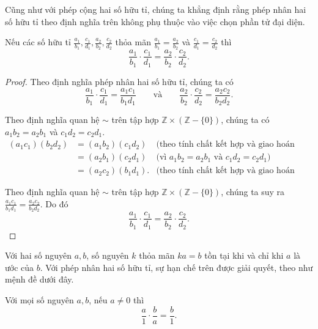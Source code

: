 Cũng như với phép cộng hai số hữu tỉ, chúng ta khẳng định rằng phép nhân hai số hữu tỉ theo định nghĩa trên không phụ thuộc vào việc chọn phần tử đại diện.
\begin{proposition}
    Nếu các số hữu tỉ $\frac{a_{1}}{b_{1}}, \frac{c_{1}}{d_{1}}, \frac{a_{2}}{b_{2}}, \frac{c_{2}}{d_{2}}$ thỏa mãn $\frac{a_{1}}{b_{1}} = \frac{a_{2}}{b_{2}}$ và $\frac{c_{1}}{d_{1}} = \frac{c_{2}}{d_{2}}$ thì
    \[
        \frac{a_{1}}{b_{1}}\cdot\frac{c_{1}}{d_{1}} = \frac{a_{2}}{b_{2}}\cdot\frac{c_{2}}{d_{2}}.
    \]
\end{proposition}

\begin{proof}
    Theo định nghĩa phép nhân hai số hữu tỉ, chúng ta có
    \[
        \frac{a_{1}}{b_{1}}\cdot\frac{c_{1}}{d_{1}} = \frac{a_{1}c_{1}}{b_{1}d_{1}}\qquad\text{và}\qquad\frac{a_{2}}{b_{2}}\cdot\frac{c_{2}}{d_{2}} = \frac{a_{2}c_{2}}{b_{2}d_{2}}.
    \]

    Theo định nghĩa quan hệ $\sim$ trên tập hợp $\mathbb{Z}\times(\mathbb{Z} - \{0\})$, chúng ta có $a_{1}b_{2} = a_{2}b_{1}$ và $c_{1}d_{2} = c_{2}d_{1}$.
    \begin{align*}
        (a_{1}c_{1})(b_{2}d_{2}) & = (a_{1}b_{2})(c_{1}d_{2})  & \text{(theo tính chất kết hợp và giao hoán của phép nhân số nguyên)} \\
                                 & = (a_{2}b_{1})(c_{2}d_{1})  & \text{(vì $a_{1}b_{2} = a_{2}b_{1}$ và $c_{1}d_{2} = c_{2}d_{1}$)}   \\
                                 & = (a_{2}c_{2})(b_{1}d_{1}). & \text{(theo tính chất kết hợp và giao hoán của phép nhân số nguyên)}
    \end{align*}

    Theo định nghĩa quan hệ $\sim$ trên tập hợp $\mathbb{Z}\times(\mathbb{Z} - \{0\})$, chúng ta suy ra $\frac{a_{1}c_{1}}{b_{1}d_{1}} = \frac{a_{2}c_{2}}{b_{2}d_{2}}$. Do đó
    \[
        \frac{a_{1}}{b_{1}}\cdot\frac{c_{1}}{d_{1}} = \frac{a_{2}}{b_{2}}\cdot\frac{c_{2}}{d_{2}}.
    \]
\end{proof}

Với hai số nguyên $a, b$, số nguyên $k$ thỏa mãn $ka = b$ tồn tại khi và chỉ khi $a$ là ước của $b$. Với phép nhân hai số hữu tỉ, sự hạn chế trên được giải quyết, theo như mệnh đề dưới đây.
\begin{proposition}
    Với mọi số nguyên $a, b$, nếu $a\ne 0$ thì
    \[
        \frac{a}{1}\cdot\frac{b}{a} = \frac{b}{1}.
    \]
\end{proposition}

